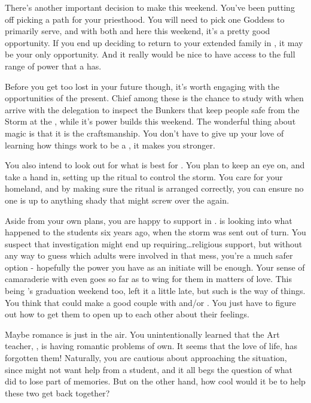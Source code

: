 \documentclass[char]{GL2020}
\begin{document}
There's another important decision to make this weekend. You've been putting off picking a path for your priesthood. You will need to pick one Goddess to primarily serve, and with both \cEbbPriest{} and \cFlowPriest{} here this weekend, it's a pretty good opportunity. If you end up deciding to return to your extended family in \pFarm{}, it may be your only opportunity. And it really would be nice to have access to the full range of power that a \cInitiate{\cleric} has.

Before you get too lost in your future though, it's worth engaging with the opportunities of the present. Chief among these  is the chance to study with \cBunker{} when \cBunker{\they} arrive with the \pShip{} delegation to inspect the Bunkers that keep people safe from the Storm at the \pSc{}, while it's power builds this weekend. The wonderful thing about \pShippies{} magic is that it is the craftsmanship. You don't have to give up your love of learning how things work to be a \cInitiate{\cleric}, it makes you stronger.

You also intend to look out for what is best for \pShip{}. You plan to keep an eye on, and take a hand in, setting up the ritual to control the storm. You care for your homeland, and by making sure the ritual is arranged correctly, you can ensure no one is up to anything shady that might screw over the \pShippies{} again.

Aside from your own plans, you are happy to support \cPresident{} in \cPresident{\theirs}. \cPresident{} is looking into what happened to the students six years ago, when the storm was sent out of turn. You suspect that investigation might end up requiring\ldots religious support, but without any way to guess which adults were involved in that mess, you're a much safer option - hopefully the power you have as an initiate will be enough. Your sense of camaraderie with \cPresident{} even goes so far as to wing\cInitiate{\person} for them in matters of love. This being \cPresident{}'s graduation weekend too, \cPresident{\they} \cPresident{\have} left it a little late, but such is the way of things. You think that \cPresident{} could make a good couple with \cHeir{} and/or \cChupStudent{}. You just have to figure out how to get them to open up to each other about their feelings.

Maybe romance is just in the air. You unintentionally learned that the Art teacher, \cChupAvenger{}, is having romantic problems of \cChupAvenger{\their} own. It seems that the love of \cChupAvenger{\their} life, \cHeadScientist{} has forgotten them! Naturally, you are cautious about approaching the situation, since \cChupAvenger{} might not want help from a student, and it all begs the question of what \cHeadScientist{} did to lose part of \cHeadScientist{\their} memories. But on the other hand, how cool would it be to help these two get back together?
\end{document}
